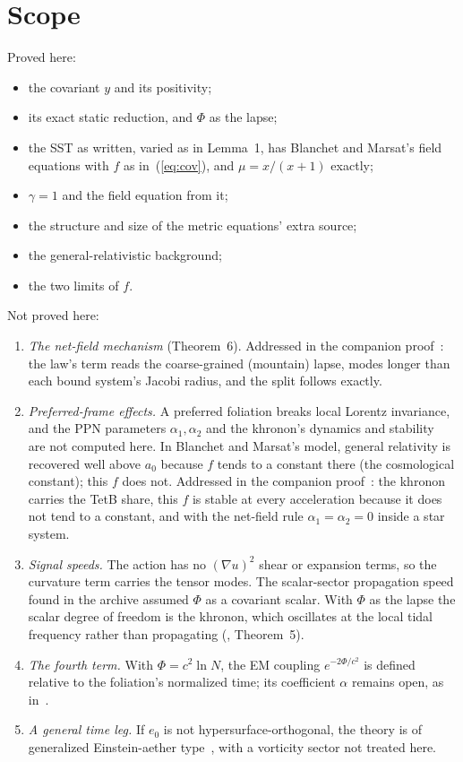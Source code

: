 \documentclass[twocolumn]{iopjournal}
\begin{document}
\section*{Scope}

Proved here:
\begin{itemize}
\item the covariant $y$ and its positivity;
\item its exact static reduction, and $\Phi$ as the lapse;
\item the SST as written, varied as in Lemma~1, has Blanchet and
Marsat's field equations with $f$ as in~(\ref{eq:cov}), and
$\mu = x/(x+1)$ exactly;
\item $\gamma = 1$ and the field equation from it;
\item the structure and size of the metric equations' extra source;
\item the general-relativistic background;
\item the two limits of $f$.
\end{itemize}

Not proved here:
\begin{enumerate}
\item \emph{The net-field mechanism} (Theorem~6). Addressed in the
companion proof~\cite{NelsonMS}: the law's term reads the
coarse-grained (mountain) lapse, modes longer than each bound system's
Jacobi radius, and the split follows exactly.
\item \emph{Preferred-frame effects.} A preferred foliation breaks
local Lorentz invariance, and the PPN parameters $\alpha_1, \alpha_2$
and the khronon's dynamics and stability~\cite{BPS2011} are not
computed here. In Blanchet and Marsat's model, general relativity is
recovered well above $a_0$ because $f$ tends to a constant there
(the cosmological constant); this $f$ does not. Addressed in the
companion proof~\cite{NelsonKh}: the khronon carries the TetB share,
this $f$ is stable at every acceleration because it does not tend to a
constant, and with the net-field rule $\alpha_1 = \alpha_2 = 0$ inside
a star system.
\item \emph{Signal speeds.} The action has no $(\nabla u)^2$ shear or
expansion terms, so the curvature term carries the tensor modes. The
scalar-sector propagation speed found in the archive assumed $\Phi$ as
a covariant scalar. With $\Phi$ as the lapse the scalar degree of
freedom is the khronon, which oscillates at the local tidal frequency
rather than propagating (\cite{NelsonKh}, Theorem~5).
\item \emph{The fourth term.} With $\Phi = c^2\ln N$, the EM coupling
$e^{-2\Phi/c^2}$ is defined relative to the foliation's normalized
time; its coefficient $\alpha$ remains open, as in~\cite{NelsonPqs}.
\item \emph{A general time leg.} If $e_0$ is not hypersurface-orthogonal,
the theory is of generalized Einstein-aether type~\cite{ZFS2007}, with
a vorticity sector not treated here.
\end{enumerate}
\end{document}
